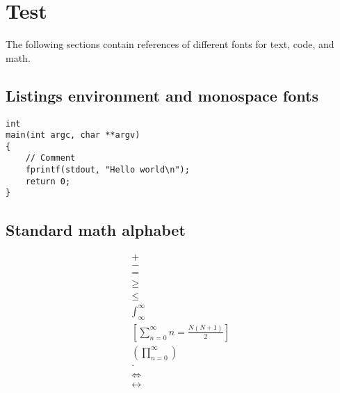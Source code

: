 \chapter{Test}
\label{chap:test}

The following sections contain references of different fonts for text, code, and
math. 

\section{Listings environment and monospace fonts}
\begin{lstlisting}[caption={My first listing}]
int
main(int argc, char **argv)
{
	// Comment
	fprintf(stdout, "Hello world\n");
	return 0;
}
\end{lstlisting}


\section{Standard math alphabet}
\begin{align}
	 +\\
	 -\\
	 =\\
	 \geq\\
	 \leq\\
	\int_{\infty}^{\infty}\\
	\left [ \sum_{n=0}^\infty n = \frac{N(N+1)}{2} \right ] \\
	\left ( \prod_{n=0}^\infty\right )\\
	\cdot \\
	\Leftrightarrow\\
	\leftrightarrow
\end{align}


\showmathalphabet


